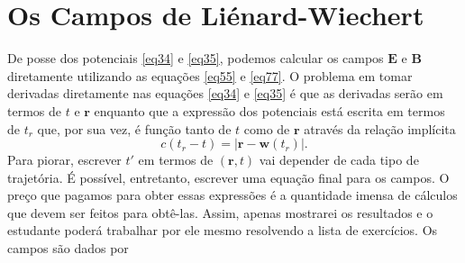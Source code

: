 \documentclass{article}
\begin{document}
\section{Os Campos de Liénard-Wiechert}

De posse dos potenciais \eqref{eq34} e \eqref{eq35}, podemos calcular os campos $\mathbf{E}$ e $\mathbf{B}$ diretamente utilizando as equações \eqref{eq55} e \eqref{eq77}. O problema em tomar derivadas diretamente nas equações \eqref{eq34} e \eqref{eq35} é que as derivadas serão em termos de $t$ e $\mathbf{r}$ enquanto que a expressão dos potenciais está escrita em termos de $t_r$ que, por sua vez, é função tanto de $t$ como de $\mathbf{r}$ através da relação implícita
\begin{equation}
    c(t_r - t) = |\mathbf{r}-\mathbf{w}(t_r)|.
\end{equation}
Para piorar, escrever $t'$ em termos de $(\mathbf{r},t)$ vai depender de cada tipo de trajetória. É possível, entretanto, escrever uma equação final para os campos. O preço que pagamos para obter essas expressões é a quantidade imensa de cálculos que devem ser feitos para obtê-las. Assim, apenas mostrarei os resultados e o estudante poderá trabalhar por ele mesmo resolvendo a lista de exercícios. Os campos são dados por
\end{document}
